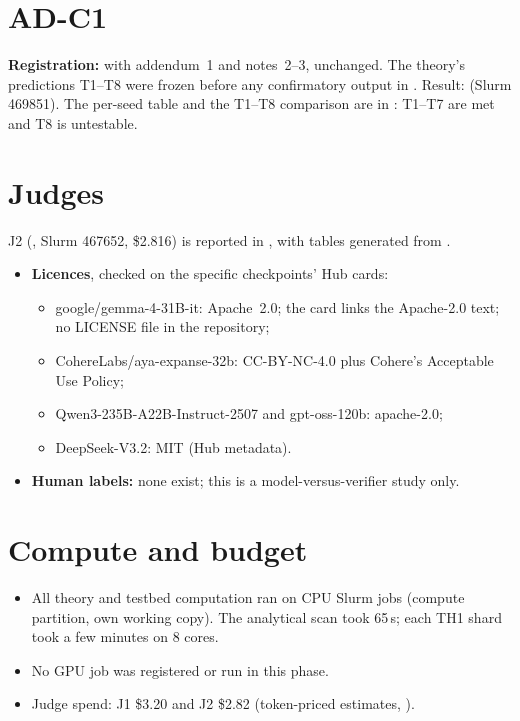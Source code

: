 \section{AD-C1}\label{app3:c1}
\textbf{Registration:}  with addendum~1 and notes~2--3, unchanged. The theory's
predictions T1--T8 were frozen before any confirmatory output in .
Result:  (Slurm 469851). The per-seed table and the T1--T8 comparison are in
: T1--T7 are met and T8 is untestable.

\section{Judges}\label{app3:judge}
J2 (, Slurm 467652, \$2.816) is reported in , with
tables generated from .
\begin{itemize}
\item \textbf{Licences}, checked on the specific checkpoints' Hub cards:
\begin{itemize}
\item google/gemma-4-31B-it: Apache~2.0; the card links the Apache-2.0 text; no LICENSE file in the repository;
\item CohereLabs/aya-expanse-32b: CC-BY-NC-4.0 plus Cohere's Acceptable Use Policy;
\item Qwen3-235B-A22B-Instruct-2507 and gpt-oss-120b: apache-2.0;
\item DeepSeek-V3.2: MIT (Hub metadata).
\end{itemize}
\item \textbf{Human labels:} none exist; this is a model-versus-verifier study only.
\end{itemize}

\section{Compute and budget}\label{app3:compute}
\begin{itemize}
\item All theory and testbed computation ran on CPU Slurm jobs (compute partition, own working copy). The analytical
scan took 65\,s; each TH1 shard took a few minutes on 8 cores.
\item No GPU job was registered or run in this phase.
\item Judge spend: J1 \$3.20 and J2 \$2.82 (token-priced estimates, ).
\end{itemize}

